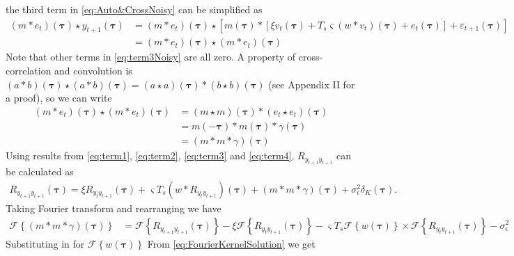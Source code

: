 \documentclass[]{article}
\begin{document}
the third term in \eqref{eq:Auto&CrossNoisy} can be simplified as
\begin{align}\label{eq:term3Noisy}
(m\ast e_t)(\boldsymbol\tau)\star y_{t+1}(\boldsymbol\tau)&= \left(m \ast e_t\right)(\boldsymbol\tau) \star\left[m\left(\boldsymbol\tau\right) \ast \left[\xi v_t\left(\boldsymbol\tau\right) + 
	T_s \varsigma \left(w \ast v_t\right)(\boldsymbol \tau)
	+ e_t\left(\boldsymbol{\tau}\right) \right]+\varepsilon_{t+1}(\boldsymbol\tau) \right]\nonumber \\
	&=\left(m \ast e_t\right)(\boldsymbol\tau)\star\left(m \ast e_t\right)(\boldsymbol\tau)
\end{align}
Note that other terms in \ref{eq:term3Noisy} are all zero. A property of cross-correlation and convolution is $(a \ast b)(\boldsymbol\tau) \star (a \ast b)(\boldsymbol\tau)=(a \star a)(\boldsymbol\tau)\ast(b \star b)(\boldsymbol\tau)$ (see Appendix II for a proof), so we can write
\begin{align}\label{eq:term4}
\left(m \ast e_t\right)(\boldsymbol\tau)\star\left(m \ast e_t\right)(\boldsymbol\tau)&=\left(m \star m\right)(\boldsymbol\tau)\ast\left(e_t \star e_t\right)(\boldsymbol\tau) \nonumber\\
&=m(-\boldsymbol\tau)\ast m(\boldsymbol\tau)\ast \gamma(\boldsymbol\tau) \nonumber \\
&=(m\ast m \ast \gamma)(\boldsymbol\tau)
\end{align}
Using results from \ref{eq:term1}, \ref{eq:term2}, \ref{eq:term3} and \ref{eq:term4}, $R_{y_{t+1}y_{t+1}}$ can be calculated as
\begin{align}
	R_{y_{t+1}y_{t+1}}(\boldsymbol{\tau})= \xi R_{y_ty_{t+1}}(\boldsymbol{\tau})+\varsigma T_s \left(w \ast R_{y_ty_{t+1}} \right)(\boldsymbol{\tau})+(m\ast m \ast \gamma)(\boldsymbol\tau)+\sigma_{\epsilon}^2\delta_K(\boldsymbol{\tau}).
\end{align}
Taking Fourier transform and rearranging we have
\begin{align}
 \mathcal F\left\lbrace (m\ast m \ast \gamma)(\boldsymbol\tau)\right\rbrace&= \mathcal F\left\lbrace R_{y_{t+1}y_{t+1}}(\boldsymbol{\tau})\right\rbrace-\xi\mathcal F\left\lbrace R_{y_{t}y_{t+1}}(\boldsymbol{\tau})\right\rbrace-\varsigma T_s \mathcal F\left\lbrace w(\boldsymbol{\tau})\right\rbrace \times \mathcal F \left\lbrace R_{y_ty_{t+1}}(\boldsymbol{\tau})\right\rbrace-\sigma_{\epsilon}^2 
\end{align}
Substituting in for $\mathcal{F}\left\lbrace w(\boldsymbol{\tau})\right\rbrace$ From \ref{eq:FourierKernelSolution} we get
\end{document}
